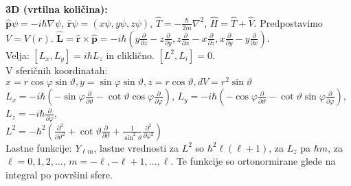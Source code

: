 \documentclass[a4paper, oneside, 12pt]{article}
\theoremstyle{definition}
\renewcommand{\phi}{\varphi}
\renewcommand{\theta}{\vartheta}
\newcommand{\dd}[2]{\ensuremath{\frac{\partial #1}{\partial #2}}}
\newcommand{\dx}[1][]{\dd{#1}{x}}
\newcommand{\dy}[1][]{\dd{#1}{y}}
\newcommand{\dz}[1][]{\dd{#1}{z}}
\newcommand{\dth}[1][]{\dd{#1}{\theta}}
\newcommand{\dphi}[1][]{\dd{#1}{\phi}}
\renewcommand{\b}{\boldsymbol}
\begin{document}
\textbf{3D (vrtilna količina):} \\
$\hat{\b{p}}\psi = -i\hbar\nabla\psi$, $\hat{\b{r}}\psi = (x\psi, y\psi, z\psi)$,
$\hat{T} = -\frac{\hbar}{2m}\nabla^2$, $\hat{H} = \hat{T} + \hat{V}$. Predpostavimo $V = V(r)$.
$\hat{\b{L}}=\hat{\b{r}}\times\hat{\b{p}} = -i\hbar\left(y\dz{} - z\dy{},
z\dx{}-x\dz{}, x\dy{} - y\dx \right)$. \\
Velja: $[L_x, L_y] = i\hbar L_z$ in cliklično. $[L^2, L_i] = 0$.  \\
V sferičnih koordinatah:
$x = r\cos\phi\sin\theta, y = \sin\phi\sin\theta, z = r\cos\theta, dV = r^2\sin\theta$ \\
$L_x = -i\hbar\left(-\sin\varphi \dth{} - \cot\theta \cos\phi \dphi{}\right)$,
$L_y = -i\hbar\left(-\cos\varphi \dth{} - \cot\theta \sin\phi \dphi{}\right)$,
$L_z = -i\hbar\dphi{}$, \\
$L^2 = -\hbar^2\left(\dd{^2}{\theta^2} + \cot\theta \dth{} +
\frac{1}{\sin^2\theta} \dd{^2}{\phi^2}\right)$ \\
Lastne funkcije: $Y_{\ell m}$, lastne vrednosti za $L^2$ so $\hbar^2\ell(\ell+1)$, za $L_z$ pa $\hbar m$,
za $\ell = 0, 1, 2, \ldots$, $m = -\ell, -\ell+1, \dots, \ell$.
Te funkcije so ortonormirane glede na integral po površini sfere. %
%
\end{document}
